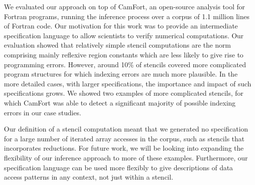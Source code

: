 \documentclass[9pt,preprint]{sigplanconf}
\theoremstyle{definition}
\begin{document}

We evaluated our approach on top of CamFort, an open-source analysis
tool for Fortran
programs, running the inference process over a corpus of 1.1
million lines of Fortran code. 
 Our motivation for this work was to
provide an intermediate specification language to allow scientists to
verify numerical computations.  Our evaluation showed that relatively
simple stencil computations are the norm comprising mainly reflexive region constants which
are less likely to give rise to programming errors.  However, around
10\% of stencils covered more complicated program structures for which
indexing errors are much more plausible. In the more detailed cases,
with larger specifications, the importance and impact of such
specifications grows.  We showed two examples of more complicated
stencils, for which CamFort was able to detect a significant majority
of possible indexing errors in our case studies.

Our definition of a stencil computation meant that we generated no
specification for a large number of iterated array accesses in the
corpus, such as stencils that incorporates reductions. For
future work, we will be looking into expanding the flexibility of 
our inference approach to more of these examples. Furthermore, our specification
language can be used more flexibly to give descriptions of data access
patterns in any context, not just within a stencil.


\end{document}
